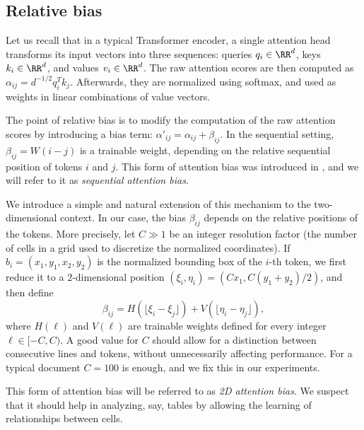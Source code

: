 \subsection{Relative bias}
\label{sec:relative-bias}


Let us recall that in a typical Transformer encoder, a single attention head
transforms its input vectors into three sequences: queries \(q_{i}\in \RR^{d}\),
keys \(k_{i}\in\RR^{d}\), and values \(v_{i}\in\RR^{d}\). The raw attention
scores are then computed as \(\alpha_{ij} = d^{-1/2}q_{i}^{T}k_{j}\).
Afterwards, they are normalized using softmax, and used as weights in linear
combinations of value vectors.

The point of relative bias is to modify the computation of the raw attention
scores by introducing a bias term: \(\alpha'_{ij} = \alpha_{ij} + \beta_{ij}\).
In the sequential setting, \(\beta_{ij} = W(i-j)\) is a trainable weight,
depending on the relative sequential position of tokens \(i\) and \(j\). This
form of attention bias was introduced in \citep{Raffel2020}, and we will refer
to it as \emph{sequential attention bias}.

We introduce a simple and natural extension of this mechanism to the
two-dimensional context. In our case, the bias \(\beta_{ij}\) depends on the
relative positions of the tokens. More precisely, let \(C \gg 1\) be an integer
resolution factor (the number of cells in a grid used to discretize the
normalized coordinates). If \(b_{i} = (x_{1}, y_{1}, x_{2}, y_{2})\) is the
normalized bounding box of the \(i\)-th token, we first reduce it to a
\(2\)-dimensional position \((\xi_{i},\eta_{i}) = (Cx_{1}, C(y_{1}+y_{2})/2) \),
and then define
\begin{equation}
  \beta_{ij} = H(\lfloor {\xi_{i} - \xi_{j}}  \rfloor) +
  V(\lfloor{\eta_{i}-\eta_{j}} \rfloor),
\end{equation}
where \(H(\ell)\) and \(V(\ell)\) are trainable weights defined for every
integer \(\ell \in [-C, C)\). A good value for \(C\) should allow for a distinction
between consecutive lines and tokens, without unnecessarily affecting
performance. For a typical document \(C=100\) is enough, and we fix this in our
experiments.

This form of attention bias will be referred to as \emph{2D attention bias}. We
suspect that it should help in analyzing, say, tables by allowing the learning
of relationships between cells.




